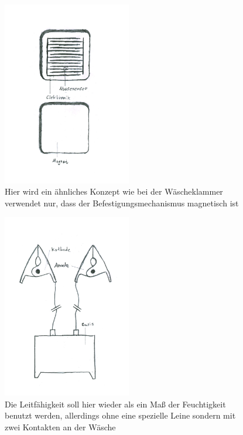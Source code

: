 \begin{figure}[htb] 
	\centerline{\includegraphics*[width=0.5\textwidth]{./10+10/Concept/04-magnet}}
	\caption{Hier wird ein ähnliches Konzept wie bei der Wäscheklammer verwendet nur, dass der Befestigungsmechanismus magnetisch ist}
	\label{10+10_magnet}
\end{figure}
\begin{figure}[htb] 
	\centerline{\includegraphics*[width=0.5\textwidth]{./10+10/Concept/05-getrennt}}
	\caption{Die Leitfähigkeit soll hier wieder als ein Maß der Feuchtigkeit benutzt werden, allerdings ohne eine spezielle Leine sondern mit zwei Kontakten an der Wäsche}
	\label{10+10_getrennt}
\end{figure}
